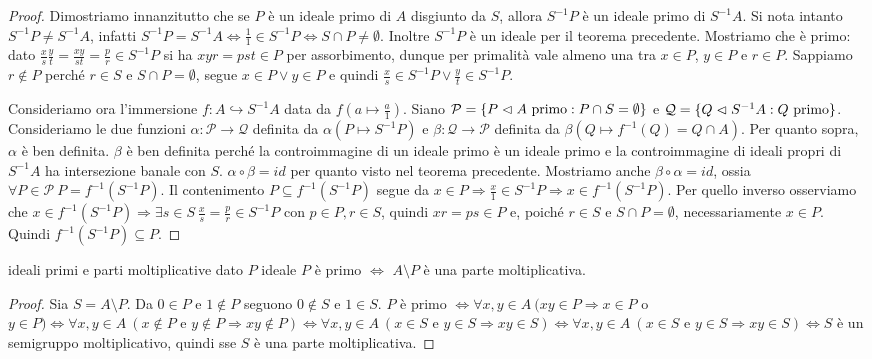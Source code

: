 \begin{proof}
    Dimostriamo innanzitutto che se $P$ è un ideale primo di $A$ disgiunto da $S$, allora $S^{-1}P$ è un ideale primo di $S^{-1}A$. Si nota intanto $S^{-1}P \neq S^{-1}A$, infatti $S^{-1}P = S^{-1}A \iff \frac{1}{1} \in S^{-1}P \iff S \cap P \neq \emptyset$. Inoltre $S^{-1}P$ è un ideale per il teorema precedente. Mostriamo che è primo: dato $\frac{x}{s} \frac{y}{t} = \frac{xy}{st} = \frac{p}{r} \in S^{-1}P$ si ha $xyr = pst \in P$ per assorbimento, dunque per primalità vale almeno una tra $x \in P$, $y \in P$ e $r \in P$. Sappiamo $r \notin P$ perché $r \in S$ e $S \cap P = \emptyset$, segue $x \in P \lor y \in P$ e quindi $\frac{x}{s} \in S^{-1}P \lor \frac{y}{t} \in S^{-1}P$.
    
    Consideriamo ora l'immersione $f : A \hookrightarrow S^{-1}A$ data da $f(a \mapsto \frac{a}{1})$.
    Siano $\mathcal{P} = \{P \vartriangleleft A \text{ primo} : P \cap S = \emptyset\}$ e $\mathcal{Q} = \{Q \vartriangleleft S^{-1}A : Q \text{ primo}\}$.
    Consideriamo le due funzioni $\alpha: \mathcal{P} \rightarrow \mathcal{Q}$ definita da $\alpha(P \mapsto S^{-1}P)$ e $\beta: \mathcal{Q} \rightarrow \mathcal{P}$ definita da $\beta(Q \mapsto f^{-1}(Q) = Q \cap A)$. Per quanto sopra, $\alpha$ è ben definita. $\beta$ è ben definita perché la controimmagine di un ideale primo è un ideale primo e la controimmagine di ideali propri di $S^{-1}A$ ha intersezione banale con $S$.
    $\alpha \circ \beta = id$ per quanto visto nel teorema precedente. Mostriamo anche $\beta \circ \alpha = id$, ossia $\forall P \in \mathcal{P} \ P = f^{-1}(S^{-1}P)$. Il contenimento $P \subseteq f^{-1}(S^{-1}P)$ segue da $x \in P \Rightarrow \frac{x}{1} \in S^{-1}P \Rightarrow x \in f^{-1}(S^{-1}P)$. Per quello inverso osserviamo che $x \in f^{-1}(S^{-1}P) \Rightarrow \exists s \in S \ \frac{x}{s} = \frac{p}{r} \in S^{-1}P$ con $p\in P, r \in S$, quindi $xr = ps \in P$ e, poiché $r \in S$ e $S \cap P = \emptyset$, necessariamente $x \in P$. Quindi $f^{-1}(S^{-1}P) \subseteq P$.
\end{proof}
\begin{proposition}{ideali primi e parti moltiplicative}
    dato $P$ ideale $P$ è primo $\iff$ $A \setminus P$ è una parte moltiplicativa.
\end{proposition}
\begin{proof}
    Sia $S = A \setminus P$. Da $0 \in P$ e $1 \notin P$ seguono $0 \notin S$ e $1 \in S$.
    $P$ è primo $\iff \forall x,y \in A \ (xy \in P \Rightarrow x \in P$ o $y \in P) \iff \forall x,y \in A \ (x \not \in P \text{ e } y \not \in P \Rightarrow xy \not \in P) \iff \forall x,y \in A \ (x \in S \text{ e } y \in S \Rightarrow xy \in S) \iff \forall x,y \in A \ (x \in S \text{ e } y \in S \Rightarrow xy \in S) \iff S$ è un semigruppo moltiplicativo, quindi sse $S$ è una parte moltiplicativa. 
\end{proof}
